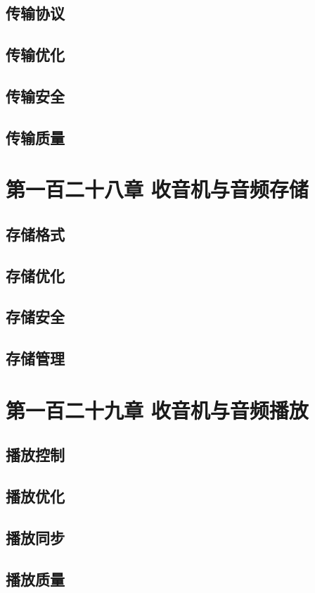 \documentclass[12pt,UTF8]{ctexbook}
\begin{document}
\section{传输协议}
\section{传输优化}
\section{传输安全}
\section{传输质量}

\chapter{第一百二十八章 收音机与音频存储}

\section{存储格式}
\section{存储优化}
\section{存储安全}
\section{存储管理}

\chapter{第一百二十九章 收音机与音频播放}

\section{播放控制}
\section{播放优化}
\section{播放同步}
\section{播放质量}
\end{document}
